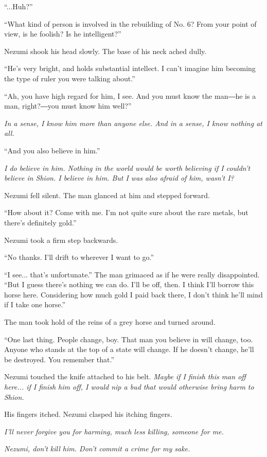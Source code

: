 ``...Huh?''

``What kind of person is involved in the rebuilding of No. 6? From your
point of view, is he foolish? Is he intelligent?''

Nezumi shook his head slowly. The base of his neck ached dully.

``He's very bright, and holds substantial intellect. I can't imagine him
becoming the type of ruler you were talking about.''

``Ah, you have high regard for him, I see. And you must know the man―he
is a man, right?―you must know him well?''

\emph{In a sense, I know him more than anyone else. And in a sense, I know
nothing at all.}

``And you also believe in him.''

\emph{I do believe in him. Nothing in the world would be worth believing if I
couldn't believe in Shion. I believe in him. But I was also afraid of
him, wasn't I?}

Nezumi fell silent. The man glanced at him and stepped forward.

``How about it? Come with me. I'm not quite sure about the rare metals,
but there's definitely gold.''

Nezumi took a firm step backwards.

``No thanks. I'll drift to wherever I want to go.''

``I see... that's unfortunate.'' The man grimaced as if he were really
disappointed. ``But I guess there's nothing we can do. I'll be off,
then. I think I'll borrow this horse here. Considering how much gold I
paid back there, I don't think he'll mind if I take one horse.''

The man took hold of the reins of a grey horse and turned around.

``One last thing. People change, boy. That man you believe in will
change, too. Anyone who stands at the top of a state will change. If he
doesn't change, he'll be destroyed. You remember that.''

Nezumi touched the knife attached to his belt. \emph{Maybe if I finish this
man off here... if I finish him off, I would nip a bud that would
otherwise bring harm to Shion.}

His fingers itched. Nezumi clasped his itching fingers.

\emph{I'll never forgive you for harming, much less killing, someone for me.}

\emph{Nezumi, don't kill him. Don't commit a crime for my sake.}


